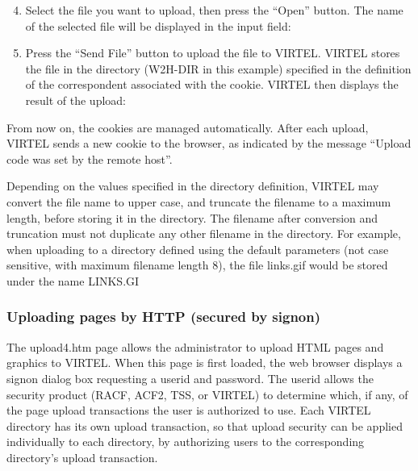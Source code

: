 \documentclass[letterpaper,10pt,english]{sphinxmanual}
\begin{document}

\begin{enumerate}
\setcounter{enumi}{3}
\item {} 
Select the file you want to upload, then press the “Open” button. The name of the selected file will be displayed in the input field:

\end{enumerate}


\begin{enumerate}
\setcounter{enumi}{4}
\item {} 
Press the “Send File” button to upload the file to VIRTEL. VIRTEL stores the file in the directory (W2H-DIR in this example) specified in the definition of the correspondent associated with the cookie. VIRTEL then displays the result of the upload:

\end{enumerate}



From now on, the cookies are managed automatically. After each upload, VIRTEL sends a new cookie to the browser, as indicated by the message “Upload code was set by the remote host”.

Depending on the values specified in the directory definition, VIRTEL may convert the file name to upper case, and truncate the filename to a maximum length, before storing it in the directory. The filename after conversion and truncation must not duplicate any other filename in the directory. For example, when uploading to a directory defined using the default parameters (not case sensitive, with maximum filename length 8), the file links.gif would be stored under the name LINKS.GI


\subsubsection{Uploading pages by HTTP (secured by signon)}
\label{\detokenize{User_Guide:uploading-pages-by-http-secured-by-signon}}\label{\detokenize{User_Guide:v457ug-http-uploading-pages-signon}}
The upload4.htm page allows the administrator to upload HTML pages and graphics to VIRTEL. When this page is first loaded, the web browser displays a signon dialog box requesting a userid and password. The userid allows the security product (RACF, ACF2, TSS, or VIRTEL) to determine which, if any, of the page upload transactions the user is authorized to use. Each VIRTEL directory has its own upload transaction, so that upload security can be applied individually to each directory, by authorizing users to the corresponding directory’s upload transaction.
\end{document}
